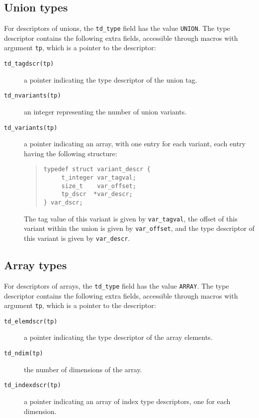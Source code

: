 \documentclass[10pt]{article}
\begin{document}
\subsection{Union types}
For descriptors of unions, the \verb+td_type+
field has the value \verb+UNION+.
The type descriptor contains the following extra fields, accessible through
macros with argument \verb+tp+, which is a pointer to the descriptor:
\begin{description}
\item[{\tt td\_tagdscr(tp)}]
a pointer indicating the type descriptor of the union tag.
\item[{\tt td\_nvariants(tp)}]
an integer representing the number of union variants.
\item[{\tt td\_variants(tp)}]
a pointer indicating an array, with one entry for each
variant, each entry having the following structure:
\begin{quote}
\begin{verbatim}
typedef struct variant_descr {
     t_integer var_tagval;
     size_t    var_offset;
     tp_dscr  *var_descr;
} var_dscr;
\end{verbatim}
\end{quote}
The tag value of this variant is given by \verb+var_tagval+,
the offset of this variant within the union is given by \verb+var_offset+,
and the type descriptor of this variant is given by \verb+var_descr+.
\end{description}

\subsection{Array types}
For descriptors of arrays, the \verb+td_type+
field has the value \verb+ARRAY+.
The type descriptor contains the following extra fields, accessible through
macros with argument \verb+tp+, which is a pointer to the descriptor:
\begin{description}
\item[{\tt td\_elemdscr(tp)}]
a pointer indicating the type descriptor of the array elements.
\item[{\tt td\_ndim(tp)}]
the number of dimensions of the array.
\item[{\tt td\_indexdscr(tp)}]
a pointer indicating an array of index type descriptors, one for each
dimension.
\end{description}
\end{document}

